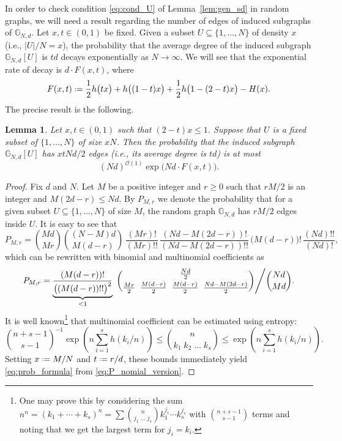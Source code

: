 \documentclass[12pt]{amsart}
\newtheorem{lemma}[theorem]{Lemma}
\theoremstyle{definition}
\newcommand\Gb{\mathbb{G}}
\newcommand\Oc{\mathcal{O}}  %
\newcommand{\defeq}{\mathrel{\vcenter{\baselineskip0.5ex \lineskiplimit0pt
                     \hbox{\scriptsize.}\hbox{\scriptsize.}}}%
                     =}
\begin{document}
In order to check condition \eqref{eq:cond_U} of Lemma~\ref{lem:gen_sd} in random graphs, we will need a result regarding the number of edges of induced subgraphs of $\Gb_{N,d}$. Let $x,t \in (0,1)$ be fixed. Given a subset $U \subseteq \{1,\ldots,N\}$ of density $x$ (i.e., $|U|/N=x$), the probability that the average degree of the induced subgraph $\Gb_{N,d}[U]$ is $td$ decays exponentially as $N \to \infty$. We will see that the exponential rate of decay  is $d \cdot F(x,t)$, where  
%
\begin{equation} \label{eq:F_formula}
F(x,t) \defeq 
\frac12 h\big( tx \big) 
+ h\big( (1-t)x \big) 
+ \frac12 h\big( 1-(2-t)x \big) 
- H(x). 
\end{equation}
%
The precise result is the following.
%
\begin{lemma} \label{lem:av_deg_gen}
Let $x,t \in (0,1)$ such that $(2-t)x\leq 1$. Suppose that $U$ is a fixed subset of $\{1,\ldots,N\}$ of size $xN$. Then the probability that the induced subgraph $\Gb_{N,d}[U]$ has $xtNd/2$ edges (i.e., its average degree is $td$) is at most 
%
\begin{equation} \label{eq:prob_formula}
(Nd)^{\Oc(1)} \exp\bigg( Nd \cdot F(x,t) \bigg) .
\end{equation}
%
\end{lemma}
%
\begin{proof}
Fix $d$ and $N$. Let $M$ be a positive integer and $r \geq 0$ such that $rM/2$ is an integer and $M(2d-r) \leq Nd$. By $P_{M,r}$ we denote the probability that for a given subset $U \subseteq \{1,\ldots,N\}$ of size $M$, the random graph $\Gb_{N,d}$ has $rM/2$ edges inside $U$. It is easy to see that 
%
\[ P_{M,r} = \binom{Md}{Mr} %
\binom{(N-M)d}{M(d-r)} \,  
\frac{(Mr)!}{(Mr)!!} \, 
\frac{(Nd-M(2d-r))!}{(Nd-M(2d-r))!!} \, 
\big( M(d-r) \big)! \, 
\frac{(Nd)!!}{(Nd)!} ,\]
%
which can be rewritten with binomial and multinomial coefficients as 
%
\begin{equation} \label{eq:P_nomial_version}
P_{M,r} = 
\underbrace{\frac{(M(d-r))!}{\big( (M(d-r))!! \big)^2}}_{
<1 } \;
\binom{\frac{Nd}{2}}{\frac{Mr}{2} \;\; \frac{M(d-r)}{2} \;\; \frac{M(d-r)}{2} \;\;  \frac{Nd-M(2d-r)}{2} } 
\Bigg/ \binom{Nd}{Md} .
\end{equation}
%
It is well known\footnote{One may prove this by considering the sum $n^n=(k_1+\cdots+k_s)^n=\sum \binom{n}{j_1 \; \ldots \; j_s} k_1^{j_1} \cdots k_s^{j_s}$ with $\binom{n+s-1}{s-1}$ terms and noting that we get the largest term for $j_i=k_i$.} that multinomial coefficient can be estimated using entropy:
%
\[ \binom{n+s-1}{s-1}^{-1} \exp\left(n \sum_{i=1}^s h(k_i/n) \right) 
\leq \binom{n}{k_1 \; k_2 \; \ldots \; k_s} 
\leq \exp\left(n \sum_{i=1}^s h(k_i/n) \right) .\]
%
Setting $x \defeq M/N$ and $t \defeq r/d$, these bounds immediately yield \eqref{eq:prob_formula} from \eqref{eq:P_nomial_version}. 
\end{proof}
\end{document}

